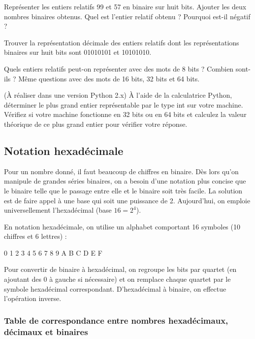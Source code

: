 \documentclass[10pt,fleqn]{article} %
\begin{document}
\begin{exercice}
Représenter les entiers relatifs 99 et 57 en binaire sur huit bits. Ajouter les deux nombres
binaires obtenus. Quel est l’entier relatif obtenu ? Pourquoi est-il négatif ?

Trouver la représentation décimale des entiers relatifs dont les représentations binaires sur
huit bits sont 01010101 et 10101010.

Quels entiers relatifs peut-on représenter avec des mots de 8 bits ? Combien sont-ils ?
Même questions avec des mots de 16 bits, 32 bits et 64 bits.

(À réaliser dans une version Python 2.x)
À l’aide de la calculatrice Python, déterminer le plus grand entier représentable par le type int sur votre
machine. Vérifiez si votre machine fonctionne en 32 bits ou en 64 bits et calculez la valeur théorique de
ce plus grand entier pour vérifier votre réponse.
\end{exercice}

\subsection{Notation hexadécimale}

Pour un nombre donné, il faut beaucoup de chiffres en binaire. Dès lors qu’on manipule de grandes séries binaires, on a besoin d’une notation plus concise que le binaire telle que le passage entre elle et le binaire soit très facile. La solution est de faire appel à une base qui soit une puissance de 2. Aujourd’hui, on emploie universellement l’hexadécimal (base $16 = 2^4$). 

En notation hexadécimale, on utilise un alphabet comportant 16 symboles (10 chiffres et 6 lettres) : 

0    1    2    3    4    5    6    7    8    9    A    B    C    D    E    F

\begin{methode}
Pour convertir de binaire à hexadécimal, on regroupe les bits par quartet (en ajoutant des 0 à gauche si nécessaire) et on remplace chaque quartet par le symbole hexadécimal correspondant. D’hexadécimal à binaire, on effectue l’opération inverse.
\end{methode}

\subsubsection*{Table de correspondance entre nombres hexadécimaux, décimaux et binaires}
\end{document}

